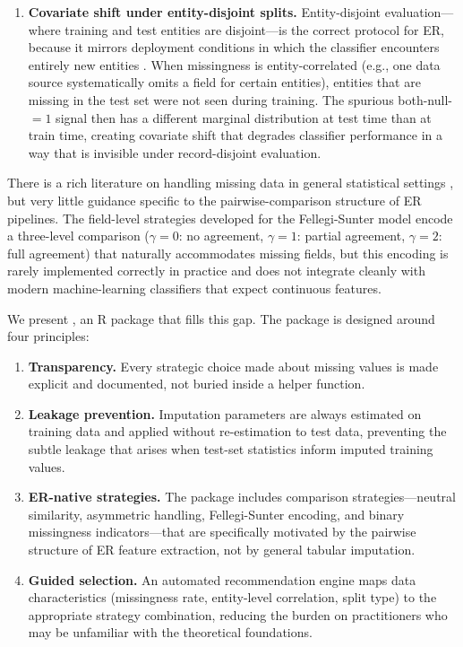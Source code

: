 \documentclass[a4paper]{article}
\begin{document}
\begin{article}
\begin{enumerate}
  \item \textbf{Covariate shift under entity-disjoint splits.}
    Entity-disjoint evaluation---where training and test entities are
    disjoint---is the correct protocol for ER, because it mirrors
    deployment conditions in which the classifier encounters entirely
    new entities \citep{Murray2016, Christen2012}. When missingness is
    entity-correlated (e.g., one data source systematically omits a
    field for certain entities), entities that are missing in the test
    set were not seen during training. The spurious both-null-$= 1$
    signal then has a different marginal distribution at test time than
    at train time, creating covariate shift that degrades classifier
    performance in a way that is invisible under record-disjoint
    evaluation.
\end{enumerate}

There is a rich literature on handling missing data in general
statistical settings \citep{Rubin1976, LittleRubin2002, vanBuuren2018},
but very little guidance specific to the pairwise-comparison structure
of ER pipelines. The field-level strategies developed for the
Fellegi-Sunter model \citep{FellegiSunter1969} encode a three-level
comparison ($\gamma = 0$: no agreement, $\gamma = 1$: partial agreement,
$\gamma = 2$: full agreement) that naturally accommodates missing fields,
but this encoding is rarely implemented correctly in practice and does
not integrate cleanly with modern machine-learning classifiers that
expect continuous features.

We present , an R package that fills this gap. The package is
designed around four principles:

\begin{enumerate}
  \item \textbf{Transparency.} Every strategic choice made about missing
    values is made explicit and documented, not buried inside a helper
    function.
  \item \textbf{Leakage prevention.} Imputation parameters are always
    estimated on training data and applied without re-estimation to test
    data, preventing the subtle leakage that arises when test-set
    statistics inform imputed training values.
  \item \textbf{ER-native strategies.} The package includes comparison
    strategies---neutral similarity, asymmetric handling, Fellegi-Sunter
    encoding, and binary missingness indicators---that are specifically
    motivated by the pairwise structure of ER feature extraction, not
    by general tabular imputation.
  \item \textbf{Guided selection.} An automated recommendation engine
    maps data characteristics (missingness rate, entity-level
    correlation, split type) to the appropriate strategy combination,
    reducing the burden on practitioners who may be unfamiliar with the
    theoretical foundations.
\end{enumerate}


\end{article}
\end{document}
